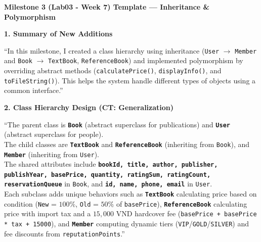\documentclass[12pt,a4paper]{article}
\begin{document}
\vspace{0.5cm}

{\fontsize{16}{20}\selectfont\bfseries Milestone 3 (Lab03 - Week 7) Template --- Inheritance \& Polymorphism\par}

\hspace{1.2cm}{\itshape\bfseries Document Title: Milestone 3 - Hierarchy \& Polymorphism,\par}
\hspace{4.8cm}{\itshape\bfseries - Generalization (Advanced Abstraction)\par}

\textbf{1. Summary of New Additions}

``In this milestone, I created a class hierarchy using inheritance (\texttt{User} $\rightarrow$ \texttt{Member} and \texttt{Book} $\rightarrow$ \texttt{TextBook}, \texttt{ReferenceBook}) and implemented polymorphism by overriding abstract methods (\texttt{calculatePrice()}, \texttt{displayInfo()}, and \texttt{toFileString()}). This helps the system handle different types of objects using a common interface.''

\textbf{2. Class Hierarchy Design (CT: Generalization)}

``The parent class is \textbf{\texttt{Book}} (abstract superclass for publications) and \textbf{\texttt{User}} (abstract superclass for people).\\
The child classes are \textbf{\texttt{TextBook}} and \textbf{\texttt{ReferenceBook}} (inheriting from \texttt{Book}), and \textbf{\texttt{Member}} (inheriting from \texttt{User}).\\
The shared attributes include \textbf{\texttt{bookId, title, author, publisher, publishYear, basePrice, quantity, ratingSum, ratingCount, reservationQueue}} in \texttt{Book}, and \textbf{\texttt{id, name, phone, email}} in \texttt{User}.\\
Each subclass adds unique behaviors such as \textbf{\texttt{TextBook}} calculating price based on condition (\texttt{New} = $100\%$, \texttt{Old} = $50\%$ of \texttt{basePrice}), \textbf{\texttt{ReferenceBook}} calculating price with import tax and a $15,000\text{ VND}$ hardcover fee (\texttt{basePrice + basePrice * tax + 15000}), and \textbf{\texttt{Member}} computing dynamic tiers (\texttt{VIP}/\texttt{GOLD}/\texttt{SILVER}) and fee discounts from \texttt{reputationPoints}.''
\end{document}
